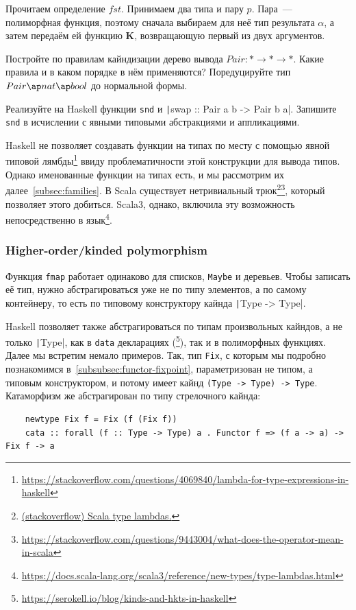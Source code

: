 Прочитаем определение $fst$.
Принимаем два типа и пару $p$.
Пара~--- полиморфная функция, поэтому сначала выбираем для неё тип результата $\alpha$, а затем передаём ей функцию $\mathbf{K}$, возвращающую первый из двух аргументов.

\begin{task}
    Постройте по правилам кайндизации дерево вывода $Pair : * \to * \to *$.
    Какие правила и в каком порядке в нём применяются?
    Поредуцируйте тип $Pair\ap nat\ap bool$ до нормальной формы.
\end{task}

\begin{task}
    Реализуйте на Haskell функции \texttt{snd} и \texttt|swap :: Pair a b -> Pair b a|.
    Запишите \texttt{snd} в исчислении с явными типовыми абстракциями и аппликациями.
\end{task}

Haskell не позволяет создавать функции на типах по месту с помощью явной типовой лямбды\footnote{\url{https://stackoverflow.com/questions/4069840/lambda-for-type-expressions-in-haskell}} ввиду проблематичности этой конструкции для вывода типов.
Однако именованные функции на типах есть, и мы рассмотрим их далее~\ref{subsec:families}.
В Scala существует нетривиальный трюк\footnote{\href{https://stackoverflow.com/questions/8736164/what-are-type-lambdas-in-scala-and-what-are-their-benefits}{(stackoverflow) Scala type lambdas.}}\footnote{\url{https://stackoverflow.com/questions/9443004/what-does-the-operator-mean-in-scala}}, который позволяет этого добиться.
Scala3, однако, включила эту возможность непосредственно в язык\footnote{\url{https://docs.scala-lang.org/scala3/reference/new-types/type-lambdas.html}}.

\subsubsection{Higher-order/kinded polymorphism}

Функция \texttt{fmap} работает одинаково для списков, \texttt{Maybe} и деревьев.
Чтобы записать её тип, нужно абстрагироваться уже не по типу элементов, а по самому контейнеру, то есть по типовому конструктору кайнда \texttt|Type -> Type|.

Haskell позволяет также абстрагироваться по типам произвольных кайндов, а не только \texttt|Type|, как в \texttt{data} декларациях (\footnote{\url{https://serokell.io/blog/kinds-and-hkts-in-haskell}}), так и в полиморфных функциях.
Далее мы встретим немало примеров.
Так, тип \texttt{Fix}, с которым мы подробно познакомимся в~\ref{subsubsec:functor-fixpoint}, параметризован не типом, а типовым конструктором, и потому имеет кайнд \texttt{(Type -> Type) -> Type}.
Катаморфизм же абстрагирован по типу стрелочного кайнда:
\begin{verbatim}
    newtype Fix f = Fix (f (Fix f))
    cata :: forall (f :: Type -> Type) a . Functor f => (f a -> a) -> Fix f -> a
\end{verbatim}

